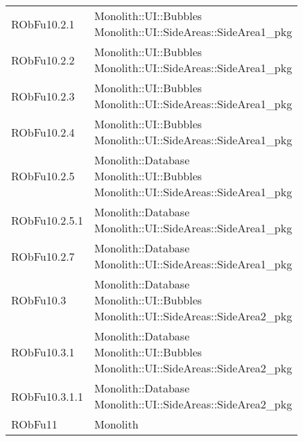 \begin{center}
\begin{longtable}{|
*{1}{>{\centering\arraybackslash}m{2.5cm}|}
*{1}{>{\centering\arraybackslash}m{7.5cm}|}}
{\\}\\\hline
RObFu10.2.1 & \makecell[l]{Monolith::UI::Bubbles
\\Monolith::UI::SideAreas::SideArea1\_pkg
\\}\\\hline
RObFu10.2.2 & \makecell[l]{Monolith::UI::Bubbles
\\Monolith::UI::SideAreas::SideArea1\_pkg
\\}\\\hline
RObFu10.2.3 & \makecell[l]{Monolith::UI::Bubbles
\\Monolith::UI::SideAreas::SideArea1\_pkg
\\}\\\hline
RObFu10.2.4 & \makecell[l]{Monolith::UI::Bubbles
\\Monolith::UI::SideAreas::SideArea1\_pkg
\\}\\\hline
RObFu10.2.5 & \makecell[l]{Monolith::Database
\\Monolith::UI::Bubbles
\\Monolith::UI::SideAreas::SideArea1\_pkg
\\}\\\hline
RObFu10.2.5.1 & \makecell[l]{Monolith::Database
\\Monolith::UI::SideAreas::SideArea1\_pkg
\\}\\\hline
RObFu10.2.7 & \makecell[l]{Monolith::Database
\\Monolith::UI::SideAreas::SideArea1\_pkg
\\}\\\hline
RObFu10.3 & \makecell[l]{Monolith::Database
\\Monolith::UI::Bubbles
\\Monolith::UI::SideAreas::SideArea2\_pkg
\\}\\\hline
RObFu10.3.1 & \makecell[l]{Monolith::Database
\\Monolith::UI::Bubbles
\\Monolith::UI::SideAreas::SideArea2\_pkg
\\}\\\hline
RObFu10.3.1.1 & \makecell[l]{Monolith::Database
\\Monolith::UI::SideAreas::SideArea2\_pkg
\\}\\\hline
RObFu11 & \makecell[l]{Monolith
\\}\\\hline

\end{longtable}
\end{center}
